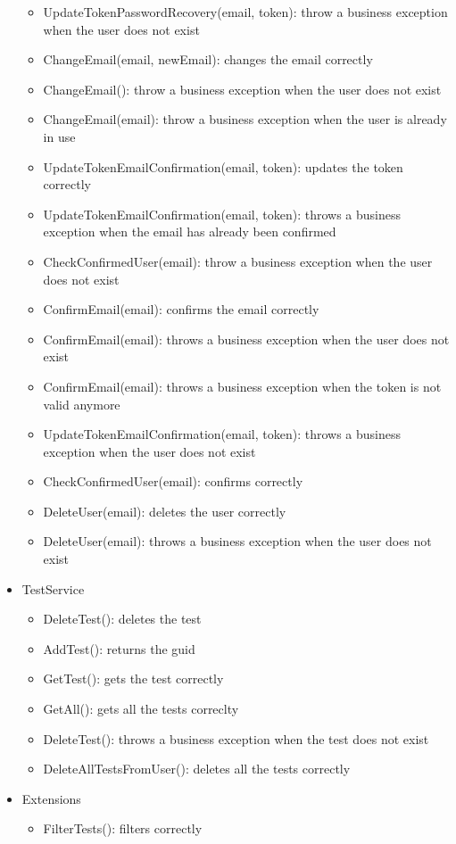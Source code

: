 \begin{itemize}[noitemsep]
\begin{itemize}[noitemsep]
                \item UpdateTokenPasswordRecovery(email, token): throw a business exception when the user does not exist
                \item ChangeEmail(email, newEmail): changes the email correctly
                \item ChangeEmail(): throw a business exception when the user does not exist 
                \item ChangeEmail(email): throw a business exception when the user is already in use
                \item UpdateTokenEmailConfirmation(email, token): updates the token correctly
                \item UpdateTokenEmailConfirmation(email, token): throws a business exception when the email has already been confirmed
                \item CheckConfirmedUser(email): throw a business exception when the user does not exist
                \item ConfirmEmail(email): confirms the email correctly
                \item ConfirmEmail(email): throws a business exception when the user does not exist
                \item ConfirmEmail(email): throws a business exception when the token is not valid anymore
                \item UpdateTokenEmailConfirmation(email, token): throws a business exception when the user does not exist
                \item CheckConfirmedUser(email): confirms correctly
                \item DeleteUser(email): deletes the user correctly
                \item DeleteUser(email): throws a business exception when the user does not exist
            \end{itemize}
        \item TestService
            \begin{itemize}[noitemsep]
                \item DeleteTest(): deletes the test 
                \item AddTest(): returns the guid 
                \item GetTest(): gets the test correctly
                \item GetAll(): gets all the tests correclty 
                \item DeleteTest(): throws a business exception when the test does not exist 
                \item DeleteAllTestsFromUser(): deletes all the tests correctly
            \end{itemize}
        \item Extensions
            \begin{itemize}
                \item FilterTests(): filters correctly
            \end{itemize}
    \end{itemize}

